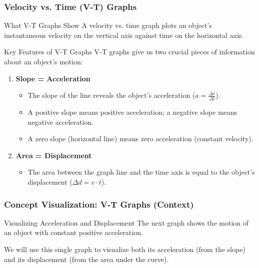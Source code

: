 \documentclass{beamer}
\begin{document}
\begin{frame}[allowframebreaks]
\frametitle{Velocity vs. Time (V-T) Graphs}
\begin{block}{What V-T Graphs Show}
A velocity vs. time graph plots an object's instantaneous velocity on the vertical axis against time on the horizontal axis.
\end{block}

\begin{block}{Key Features of V-T Graphs}
V-T graphs give us two crucial pieces of information about an object's motion:
\begin{enumerate}
    \item \textbf{Slope = Acceleration}
    \begin{itemize}
        \item The slope of the line reveals the object's acceleration ($ a = \frac{\Delta v}{\Delta t} $).
        \item A positive slope means positive acceleration; a negative slope means negative acceleration.
        \item A zero slope (horizontal line) means zero acceleration (constant velocity).
    \end{itemize}
    \item \textbf{Area = Displacement}
    \begin{itemize}
        \item The area between the graph line and the time axis is equal to the object's displacement ($ \Delta d = v \cdot t $).
    \end{itemize}
\end{enumerate}
\end{block}
\end{frame}

\begin{frame}[allowframebreaks]
\frametitle{Concept Visualization: V-T Graphs (Context)}
\begin{block}{Visualizing Acceleration and Displacement}
The next graph shows the motion of an object with constant positive acceleration.

We will use this single graph to visualize both its acceleration (from the slope) and its displacement (from the area under the curve).
\end{block}
\end{frame}
\end{document}
